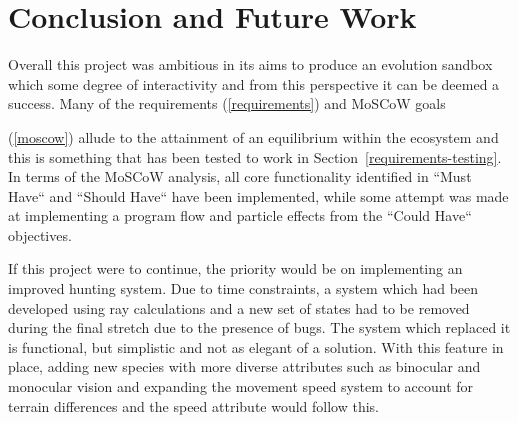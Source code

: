 \documentclass[a4paper, oneside, 11pt]{report}
\begin{document}
\chapter{Conclusion and Future Work}\label{conclusion}
Overall this project was ambitious in its aims to produce an evolution sandbox which some degree of interactivity and from this perspective it can be deemed a success. Many of the requirements (\ref{requirements}) and MoSCoW goals {(\ref{moscow}) allude to the attainment of an equilibrium within the ecosystem and this is something that has been tested to work in Section~\ref{requirements-testing}. In terms of the MoSCoW analysis, all core functionality identified in ``Must Have`` and ``Should Have`` have been implemented, while some attempt was made at implementing a program flow and particle effects from the ``Could Have`` objectives.

If this project were to continue, the priority would be on implementing an improved hunting system. Due to time constraints, a system which had been developed using ray calculations and a new set of states had to be removed during the final stretch due to the presence of bugs. The system which replaced it is functional, but simplistic and not as elegant of a solution. With this feature in place, adding new species with more diverse attributes such as binocular and monocular vision and expanding the movement speed system to account for terrain differences and the speed attribute would follow this.




}
\end{document}
